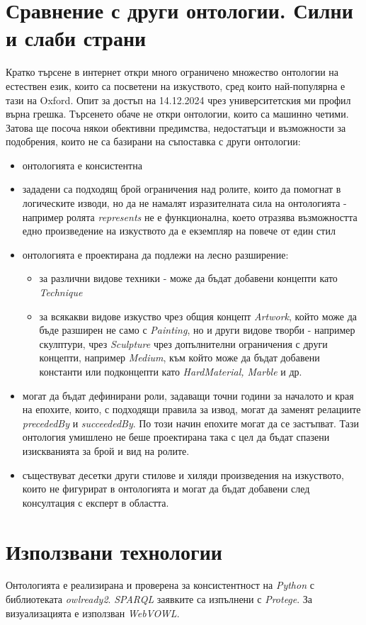 \documentclass[a4paper, 11pt]{article}
\begin{document}
\section{Сравнение с други онтологии. Силни и слаби страни}
Кратко търсене в интернет откри много ограничено множество онтологии на естествен език, които са посветени на изкуството, сред които най-популярна е тази на Oxford\cite{Davies2009-hf}. Опит за достъп на 14.12.2024 чрез университетския ми профил върна грешка. 
\newline
Търсенето обаче не откри онтологии, които са машинно четими. Затова ще посоча някои обективни предимства, недостатъци и възможности за подобрения, които не са базирани на съпоставка с други онтологии:
\begin{itemize}
  \item онтологията е консистентна
  \item зададени са подходящ брой ограничения над ролите, които да помогнат в логическите изводи, но да не намалят изразителната сила на онтологията - например ролята \emph{represents} не е функционална, което отразява възможността едно произведение на изкуството да е екземпляр на повече от един стил
  \item онтологията е проектирана да подлежи на лесно разширение:
  \begin{itemize}
    \item за различни видове техники - може да бъдат добавени концепти като \emph{Technique}
    \item за всякакви видове изкуство чрез общия концепт \emph{Artwork}, който може да бъде разширен не само с \emph{Painting}, но и други видове творби - например скулптури, чрез \emph{Sculpture} чрез допълнителни ограничения с други концепти, например \emph{Medium}, към който може да бъдат добавени константи или подконцепти като \emph{HardMaterial, Marble} и др.
  \end{itemize}
  \item могат да бъдат дефинирани роли, задаващи точни години за началото и края на епохите, които, с подходящи правила за извод, могат да заменят релациите \emph{precededBy} и \emph{succeededBy}. По този начин епохите могат да се застъпват. Тази онтология умишлено не беше проектирана така с цел да бъдат спазени изискванията за брой и вид на ролите.
  \item съществуват десетки други стилове и хиляди произведения на изкуството, които не фигурират в онтологията и могат да бъдат добавени след консултация с експерт в областта. 
\end{itemize}

\section{Използвани технологии}
Онтологията е реализирана и проверена за консистентност на \emph{Python} с библиотеката \emph{owlready2}. \emph{SPARQL} заявките са изпълнени с \emph{Protege}. За визуализацията е използван \emph{WebVOWL}.
\pagebreak

\nocite{wikipediaCampbellsSoup,wikipediaGirlWith,wikipediaMonaLisa,wikipediaPortraitChalk,wikipediaThird1808,wikipediaHaystacksMonet,wikipediaStarryNight,wikipediaPeriodsWestern,wikipediaVisualArts,studiobinderHistoryTimeline}
\printbibliography
\end{document}
